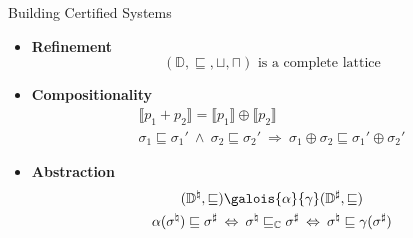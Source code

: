\documentclass{beamer}
\begin{document}
\begin{frame}{Building Certified Systems} %
\small
\begin{center}
\end{center}
\begin{itemize}
\item \textbf{Refinement}
  \[ (\mathbb{D}, {\sqsubseteq}, {\sqcup}, {\sqcap})
     \mbox{ is a complete lattice} \]
\item \textbf{Compositionality}
  \begin{gather*}
    \llbracket p_1 + p_2 \rrbracket =
    \llbracket p_1 \rrbracket \oplus \llbracket p_2 \rrbracket
    \\
    \sigma_1 \sqsubseteq \sigma_1' \:\wedge\:
    \sigma_2 \sqsubseteq \sigma_2' \:\Rightarrow\:
    \sigma_1 \oplus \sigma_2 \sqsubseteq \sigma_1' \oplus \sigma_2'
  \end{gather*}
\item \textbf{Abstraction}
  \begin{gather*}
    (\mathbb{D}^\natural, {\sqsubseteq})
    \galois{\alpha}{\gamma}
    (\mathbb{D}^\sharp, {\sqsubseteq})
    \\
    \alpha(\sigma^\natural) \sqsubseteq \sigma^\sharp
    \: \Leftrightarrow \:
    \sigma^\natural \sqsubseteq_\mathbb{C} \sigma^\sharp
    \: \Leftrightarrow \:
    \sigma^\natural \sqsubseteq \gamma(\sigma^\sharp)
  \end{gather*}
\end{itemize}
\end{frame}

\end{document}
